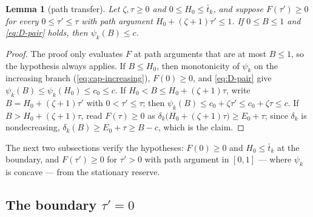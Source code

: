 \documentclass[11pt]{article}
\newtheorem{lemma}[theorem]{Lemma}
\theoremstyle{definition}
\theoremstyle{remark}
\begin{document}
\begin{lemma}[path transfer]\label{lem:D-transfer}
Let $\zeta,\tau\ge0$ and $0\le H_0\le\bar t_k$, and suppose
$F(\tau')\ge0$ for every $0\le\tau'\le\tau$ with path argument
$H_0+(\zeta+1)\tau'\le1$.  If $0\le B\le1$ and
\eqref{eq:D-pair} holds, then $\psi_k(B)\le c$.
\end{lemma}

\begin{proof}
The proof only evaluates $F$ at path arguments that are at most $B\le1$,
so the hypothesis always applies.  If $B\le H_0$, then monotonicity of
$\psi_k$ on the increasing branch
(\eqref{eq:cap-increasing}), $F(0)\ge0$, and \eqref{eq:D-pair} give
$\psi_k(B)\le\psi_k(H_0)\le c_0\le c$.  If $H_0<B\le H_0+(\zeta+1)\tau$,
write $B=H_0+(\zeta+1)\tau'$ with $0<\tau'\le\tau$; then
$\psi_k(B)\le c_0+\zeta\tau'\le c_0+\zeta\tau\le c$.  If
$B>H_0+(\zeta+1)\tau$, read $F(\tau)\ge0$ as
$\delta_k\bigl(H_0+(\zeta+1)\tau\bigr)\ge E_0+\tau$; since $\delta_k$ is
nondecreasing, $\delta_k(B)\ge E_0+\tau\ge B-c$, which is the claim.
\end{proof}

The next two subsections verify the hypotheses: $F(0)\ge0$ and
$H_0\le\bar t_k$ at the boundary, and $F(\tau')\ge0$ for $\tau'>0$ with
path argument in $[0,1]$ --- where $\psi_k$ is concave --- from the
stationary reserve.

\subsection{The boundary \texorpdfstring{$\tau'=0$}{tau' = 0}}
\end{document}
